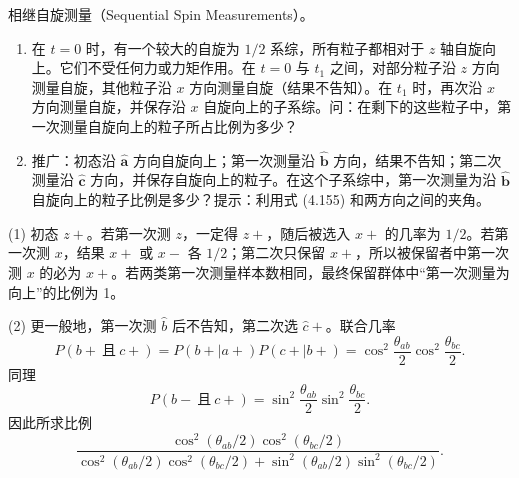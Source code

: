 \begin{question}
相继自旋测量（Sequential Spin Measurements）。
\begin{enumerate}
\item 在 $t=0$ 时，有一个较大的自旋为 $1/2$ 系综，所有粒子都相对于 $z$ 轴自旋向上。它们不受任何力或力矩作用。在 $t=0$ 与 $t_1$ 之间，对部分粒子沿 $z$ 方向测量自旋，其他粒子沿 $x$ 方向测量自旋（结果不告知）。在 $t_1$ 时，再次沿 $x$ 方向测量自旋，并保存沿 $x$ 自旋向上的子系综。问：在剩下的这些粒子中，第一次测量自旋向上的粒子所占比例为多少？
\item 推广：初态沿 $\hat{\mathbf a}$ 方向自旋向上；第一次测量沿 $\hat{\mathbf b}$ 方向，结果不告知；第二次测量沿 $\hat{\mathbf c}$ 方向，并保存自旋向上的粒子。在这个子系综中，第一次测量为沿 $\hat{\mathbf b}$ 自旋向上的粒子比例是多少？提示：利用式 (4.155) 和两方向之间的夹角。
\end{enumerate}

\par\smallskip
{}

\end{question}
\begin{solution}

(1) 初态 $z+$。若第一次测 $z$，一定得 $z+$，随后被选入 $x+$ 的几率为 $1/2$。若第一次测 $x$，结果 $x+$ 或 $x-$ 各 $1/2$；第二次只保留 $x+$，所以被保留者中第一次测 $x$ 的必为 $x+$。若两类第一次测量样本数相同，最终保留群体中“第一次测量为向上”的比例为 1。

(2) 更一般地，第一次测 $\hat b$ 后不告知，第二次选 $\hat c+$。联合几率
\[
P(b+\ \text{且}\ c+)=P(b+|a+)P(c+|b+)
=\cos^2\frac{\theta_{ab}}2\cos^2\frac{\theta_{bc}}2.
\]
同理
\[
P(b-\ \text{且}\ c+)=\sin^2\frac{\theta_{ab}}2\sin^2\frac{\theta_{bc}}2.
\]
因此所求比例
\[
\frac{\cos^2(\theta_{ab}/2)\cos^2(\theta_{bc}/2)}{\cos^2(\theta_{ab}/2)\cos^2(\theta_{bc}/2)+\sin^2(\theta_{ab}/2)\sin^2(\theta_{bc}/2)}.
\]

\end{solution}

